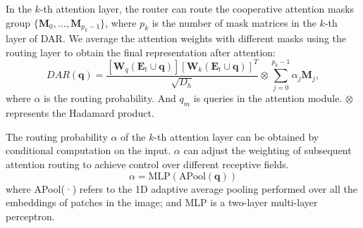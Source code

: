 In the $k$-th attention layer, the router can route the cooperative attention masks group $\{\mathbf{M}_0,\dots,\mathbf{M}_{p_k-1}\}$, where $p_k$ is the number of mask matrices in the $k$-th layer of DAR. We average the attention weights with different masks using the routing layer to obtain the final representation after attention:
\begin{equation}
\label{eq10}
    DAR(\mathbf{q}) =\frac{[\mathbf{W}_q(\mathbf{E}_t \cup \mathbf{q})][\mathbf{W}_k(\mathbf{E}_t \cup \mathbf{q})]^T}{\sqrt{D_h}}\otimes\sum_{j=0}^{p_k-1}\alpha_j \mathbf{M}_j,
\end{equation}
where $\alpha$ is the routing probability. And $q_m$ is queries in the attention module. $\otimes$ represents the Hadamard product.

The routing probability $\alpha$ of the $k$-th attention layer can be obtained by conditional computation on the input. $\alpha$ can adjust the weighting of subsequent attention routing to achieve control over different receptive fields.
\begin{equation}
\label{eq11}
    \alpha = \text{MLP}(\text{APool}(\mathbf{q}))
\end{equation}
where APool(·) refers to the 1D adaptive average pooling performed over all the embeddings of patches in the image; and MLP is a two-layer multi-layer perceptron. 
